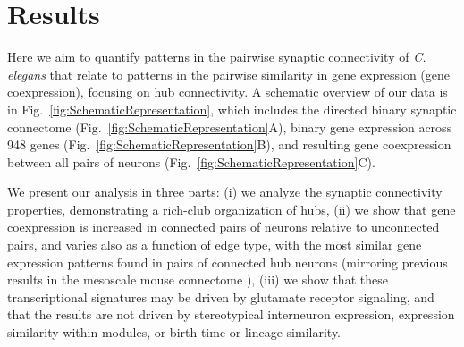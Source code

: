 \documentclass[10pt,letterpaper]{article}
\begin{document}
\section*{Results}

Here we aim to quantify patterns in the pairwise synaptic connectivity of \emph{C. elegans} that relate to patterns in the pairwise similarity in gene expression (gene coexpression), focusing on hub connectivity.
A schematic overview of our data is in Fig.~\ref{fig:SchematicRepresentation}, which includes the directed binary synaptic connectome (Fig.~\ref{fig:SchematicRepresentation}A), binary gene expression across 948 genes (Fig.~\ref{fig:SchematicRepresentation}B), and resulting gene coexpression between all pairs of neurons (Fig.~\ref{fig:SchematicRepresentation}C).

We present our analysis in three parts:
(i) we analyze the synaptic connectivity properties, demonstrating a rich-club organization of hubs,
(ii) we show that gene coexpression is increased in connected pairs of neurons relative to unconnected pairs, and varies also as a function of edge type, with the most similar gene expression patterns found in pairs of connected hub neurons (mirroring previous results in the mesoscale mouse connectome \cite{Fulcher:2016ck}),
(iii) we show that these transcriptional signatures may be driven by glutamate receptor signaling, and that the results are not driven by stereotypical interneuron expression, expression similarity within modules, or birth time or lineage similarity.
\end{document}
